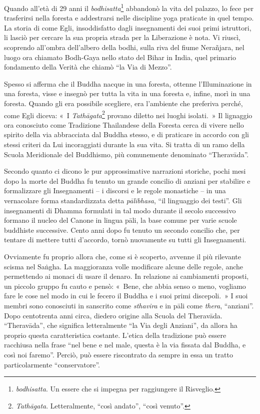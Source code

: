 Quando all'età di 29 anni il \emph{bodhisatta}\footnote{\emph{bodhisatta}.
  Un essere che si impegna per raggiungere il Risveglio.} abbandonò la
vita del palazzo, lo fece per trasferirsi nella foresta e addestrarsi
nelle discipline yoga praticate in quel tempo. La storia di come Egli,
insoddisfatto dagli insegnamenti dei suoi primi istruttori, li lasciò
per cercare la sua propria strada per la Liberazione è nota. Vi riuscì,
scoprendo all'ombra dell'albero della bodhi, sulla riva del fiume
Nerañjara, nel luogo ora chiamato Bodh-Gaya nello stato del Bihar in
India, quel primario fondamento della Verità che chiamò ``la Via di
Mezzo''.

Spesso si afferma che il Buddha nacque in una foresta, ottenne
l'Illuminazione in una foresta, visse e insegnò per tutta la vita in una
foresta e, infine, morì in una foresta. Quando gli era possibile
scegliere, era l'ambiente che preferiva perché, come Egli diceva: «~I
\emph{Tathāgata}\footnote{\emph{Tathāgata}. Letteralmente, ``così
  andato'', ``così venuto''.} provano diletto nei luoghi isolati.~» Il
lignaggio ora conosciuto come Tradizione Thailandese della Foresta cerca
di vivere nello spirito della via abbracciata dal Buddha stesso, e di
praticare in accordo con gli stessi criteri da Lui incoraggiati durante
la sua vita. Si tratta di un ramo della Scuola Meridionale del
Buddhismo, più comunemente denominato ``Theravāda''.

Secondo quanto ci dicono le pur approssimative narrazioni storiche,
pochi mesi dopo la morte del Buddha fu tenuto un grande concilio di
anziani per stabilire e formalizzare gli Insegnamenti -- i discorsi e le
regole monastiche -- in una vernacolare forma standardizzata detta
\emph{pālibhasa}, ``il linguaggio dei testi''. Gli insegnamenti di
Dhamma formulati in tal modo durante il secolo successivo formano il
nucleo del Canone in lingua pāli, la base comune per varie scuole
buddhiste successive. Cento anni dopo fu tenuto un secondo concilio che,
per tentare di mettere tutti d'accordo, tornò nuovamente su tutti gli
Insegnamenti.

Ovviamente fu proprio allora che, come si è scoperto, avvenne il più
rilevante scisma nel Saṅgha. La maggioranza volle modificare alcune
delle regole, anche permettendo ai monaci di usare il denaro. In
relazione ai cambiamenti proposti, un piccolo gruppo fu cauto e pensò:
«~Bene, che abbia senso o meno, vogliamo fare le cose nel modo in cui le
fecero il Buddha e i suoi primi discepoli.~» I suoi membri sono
conosciuti in sanscrito come \emph{sthavira} e in pāli come
\emph{thera}, ``anziani''. Dopo centotrenta anni circa, diedero origine
alla Scuola del Theravāda. ``Theravāda'', che significa letteralmente
``la Via degli Anziani'', da allora ha proprio questa caratteristica
costante. L'etica della tradizione può essere racchiusa nella frase
``nel bene e nel male, questa è la via fissata dal Buddha, e così noi
faremo''. Perciò, può essere riscontrato da sempre in essa un tratto
particolarmente ``conservatore''.


